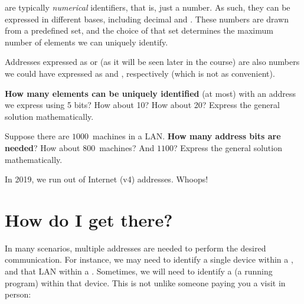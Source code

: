  are typically \textit{numerical} identifiers, that is, just a number.
As such, they can be expressed in different bases, including decimal and .
These numbers are drawn from a predefined set, and the choice of that set
determines the maximum number of elements we can uniquely identify.

\begin{remark}
Addresses expressed as  or  
(as it will be seen later in the course) are also numbers we could have expressed 
as  and , respectively
(which is not as convenient).
\end{remark}

\begin{exercise}
\textbf{How many elements can be uniquely identified} (at most) with an address we express 
using 5 bits? How about 10? How about 20? Express the general solution mathematically.
\end{exercise}

\begin{exercise}
Suppose there are $1000$~machines in a LAN. \textbf{How many address bits are needed}?
How about $800$~machines? And $1100$? Express the general solution mathematically.
\end{exercise} 

\begin{remark}
In 2019, we run out of Internet (v4) addresses. Whoops!
\end{remark}

\section{How do I get there?}

In many scenarios, multiple addresses are needed to perform the desired 
 communication. For instance, we may need to identify
a single device within a , and that LAN within a . Sometimes, we will need 
to identify a  (a running program) within that device. 
This is not unlike someone paying you a visit in person:


